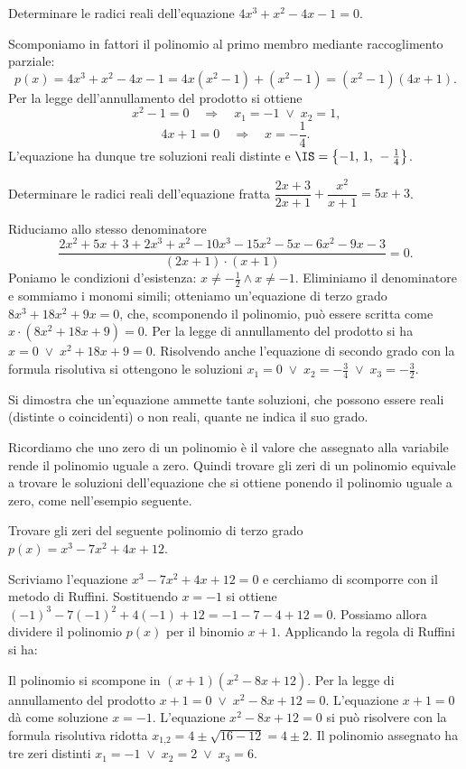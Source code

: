 \begin{exrig}
\begin{esempio}
Determinare le radici reali dell'equazione $4x^3+x^2-4x-1=0$.

Scomponiamo in fattori il polinomio al primo membro mediante raccoglimento parziale: 
\[p(x)=4x^3+x^2-4x-1=4x \left(x^2-1\right)+\left(x^2-1\right)=\left(x^2-1\right) (4x+1).\] 
Per la legge dell'annullamento del prodotto si ottiene 
\[x^2-1=0 \quad\Rightarrow\quad x_1=-1 \;\vee\;x_2=1\text{,}\]
\[4x+1=0 \quad\Rightarrow\quad x=-\frac{1}{4}.\]
L'equazione ha dunque tre soluzioni reali distinte e $\IS=\left\{-1\text{, }1\text{, }-\frac 1 4\right\}$.
\end{esempio}
\begin{esempio}
Determinare le radici reali dell'equazione fratta $\dfrac{2x+3}{2x+1}+\dfrac{x^2}{x+1}=5x+3$.

Riduciamo allo stesso denominatore 
\[\frac{2x^2+5x+3+2x^3+x^2-10x^3-15x^2-5x-6x^2-9x-3}{(2x+1)\cdot (x+1)}=0.\]
Poniamo le condizioni d'esistenza: $x\neq -\frac 1 2\wedge x\neq -1$. Eliminiamo il denominatore e sommiamo i monomi simili; otteniamo un'equazione di terzo grado $8x^3+18x^2+9x=0$, che, scomponendo il polinomio, può essere scritta come $x\cdot \left(8x^2+18x+9\right)=0$. Per la legge di annullamento del prodotto si ha $x=0\;\vee\;x^2+18x+9=0$. Risolvendo anche l'equazione di secondo grado con la formula risolutiva si ottengono le soluzioni $x_1=0\;\vee\; x_2=-\frac 3 4\;\vee\; x_3=-\frac 3 2$.

\osservazione
Si dimostra che un'equazione ammette tante soluzioni, che possono essere reali (distinte o coincidenti) o non reali, quante ne indica il suo grado.

Ricordiamo che uno zero di un polinomio è il valore che assegnato alla variabile rende il polinomio uguale a zero. Quindi trovare gli zeri di un polinomio equivale a trovare le soluzioni dell'equazione che si ottiene ponendo il polinomio uguale a zero, come nell'esempio seguente.
\end{esempio}

\begin{esempio}
Trovare gli zeri del seguente polinomio di terzo grado $p(x)=x^3-7x^2+4x+12$.

Scriviamo l'equazione $x^3-7x^2+4x+12=0$ e cerchiamo di scomporre con il metodo di Ruffini. Sostituendo $x=-1$ si ottiene $(-1)^3-7(-1)^2+4(-1)+12=-1-7-4+12=0$. Possiamo allora dividere il polinomio $p(x)$ per il binomio $x+1$. Applicando la regola di Ruffini si ha:
\begin{center}

\end{center}
Il polinomio si scompone in $(x+1)(x^2-8x+12)$. Per la legge di annullamento del prodotto $x+1=0\;\vee\; x^2-8x+12=0$. L'equazione $x+1=0$ dà come soluzione $x=-1$. L'equazione $x^2-8x+12=0$ si può risolvere con la formula risolutiva ridotta $x_{1\text{,}2}=4\pm \sqrt{16-12}=4\pm 2$. Il polinomio assegnato ha tre zeri distinti $x_1=-1\;\vee\; x_2=2\;\vee\; x_3=6$.
\end{esempio}
\end{exrig}
